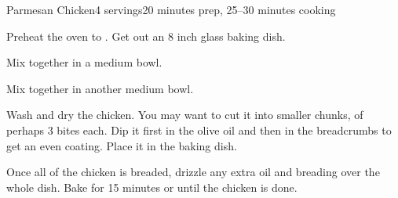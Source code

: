 \documentclass[../Cookbook.tex]{subfiles}
\begin{document}
\begin{recipe}{Parmesan Chicken}{4 servings}{20 minutes prep, 25--30 minutes cooking}

Preheat the oven to . Get out an 8 inch glass baking dish.

Mix together in a medium bowl.

Mix together in another medium bowl.

Wash and dry the chicken. You may want to cut it into smaller chunks, of perhaps 3 bites each. Dip it first in the olive oil and then in the breadcrumbs to get an even coating. Place it in the baking dish.

\newstep
Once all of the chicken is breaded, drizzle any extra oil and breading over the whole dish.
Bake for 15 minutes or until the chicken is done.


\end{recipe}
\end{document}

